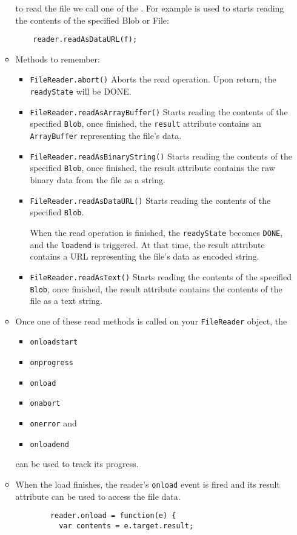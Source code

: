 \begin{itemize}
\begin{itemize}
    to read the file we call one of the 
. For example
is used to starts reading the contents of the specified Blob or File:
    \begin{verbatim}
    reader.readAsDataURL(f);
    \end{verbatim}
    \item Methods to remember: 
    \begin{itemize}
    \item \verb|FileReader.abort()|
    Aborts the read operation. Upon return, the \verb|readyState| will be DONE.
    \item \verb|FileReader.readAsArrayBuffer()|
    Starts reading the contents of the specified \verb|Blob|, once finished, the \verb|result| attribute contains an \verb|ArrayBuffer| representing the file's data.
    \item \verb|FileReader.readAsBinaryString()|
    Starts reading the contents of the specified \verb|Blob|, once finished, the result attribute contains the raw binary data from the file as a string.
    \item \verb|FileReader.readAsDataURL()|
    Starts reading the contents of the specified \verb|Blob|.

     When the read operation is finished, the \verb|readyState| becomes \verb|DONE|, and the \verb|loadend| is triggered. At that time, the result attribute contains a URL representing the file's data as   encoded string.
    \item \verb|FileReader.readAsText()|
Starts reading the contents of the specified \verb|Blob|, once finished, the result attribute contains the contents of the file as a text string.
\end{itemize}
\item
Once one of these read methods is called on your \verb|FileReader| object, the 
\begin{itemize}
\item \verb|onloadstart|
\item \verb|onprogress|
\item \verb|onload|
\item \verb|onabort|
\item \verb|onerror| and 
\item \verb|onloadend| 
\end{itemize}
can be used to track its progress.
  \item
    When the load finishes, 
    the reader's
    \verb|onload| event is fired and its result attribute can be used to access
    the file data.
      \begin{verbatim}
        reader.onload = function(e) { 
          var contents = e.target.result;
          

\end{verbatim}
\end{itemize}
\end{itemize}
